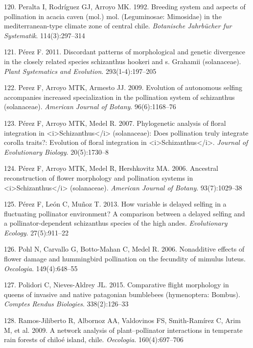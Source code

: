 \documentclass[
]{article}
\begin{document}
\leavevmode\hypertarget{ref-RN169}{}%
120. Peralta I, Rodríguez GJ, Arroyo MK. 1992. Breeding system and
aspects of pollination in acacia caven (mol.) mol. (Leguminosae:
Mimosidae) in the mediterranean-type climate zone of central chile.
\emph{Botanische Jahrbücher fur Systematik}. 114(3):297--314

\leavevmode\hypertarget{ref-RN149}{}%
121. Pérez F. 2011. Discordant patterns of morphological and genetic
divergence in the closely related species schizanthus hookeri and s.
Grahamii (solanaceae). \emph{Plant Systematics and Evolution}.
293(1-4):197--205

\leavevmode\hypertarget{ref-RN148}{}%
122. Perez F, Arroyo MTK, Armesto JJ. 2009. Evolution of autonomous
selfing accompanies increased specialization in the pollination system
of schizanthus (solanaceae). \emph{American Journal of Botany}.
96(6):1168--76

\leavevmode\hypertarget{ref-RN147}{}%
123. Pérez F, Arroyo MTK, Medel R. 2007. Phylogenetic analysis of floral
integration in
\textless i\textgreater Schizanthus\textless/i\textgreater{}
(solanaceae): Does pollination truly integrate corolla traits?:
Evolution of floral integration in
\textless i\textgreater Schizanthus\textless/i\textgreater.
\emph{Journal of Evolutionary Biology}. 20(5):1730--8

\leavevmode\hypertarget{ref-RN146}{}%
124. Pérez F, Arroyo MTK, Medel R, Hershkovitz MA. 2006. Ancestral
reconstruction of flower morphology and pollination systems in
\textless i\textgreater Schizanthus\textless/i\textgreater{}
(solanaceae). \emph{American Journal of Botany}. 93(7):1029--38

\leavevmode\hypertarget{ref-RN150}{}%
125. Pérez F, León C, Muñoz T. 2013. How variable is delayed selfing in
a fluctuating pollinator environment? A comparison between a delayed
selfing and a pollinator-dependent schizanthus species of the high
andes. \emph{Evolutionary Ecology}. 27(5):911--22

\leavevmode\hypertarget{ref-RN151}{}%
126. Pohl N, Carvallo G, Botto-Mahan C, Medel R. 2006. Nonadditive
effects of flower damage and hummingbird pollination on the fecundity of
mimulus luteus. \emph{Oecologia}. 149(4):648--55

\leavevmode\hypertarget{ref-RN60}{}%
127. Polidori C, Nieves-Aldrey JL. 2015. Comparative flight morphology
in queens of invasive and native patagonian bumblebees (hymenoptera:
Bombus). \emph{Comptes Rendus Biologies}. 338(2):126--33

\leavevmode\hypertarget{ref-RN61}{}%
128. Ramos-Jiliberto R, Albornoz AA, Valdovinos FS, Smith-Ramírez C,
Arim M, et al. 2009. A network analysis of plant--pollinator
interactions in temperate rain forests of chiloé island, chile.
\emph{Oecologia}. 160(4):697--706
\end{document}
